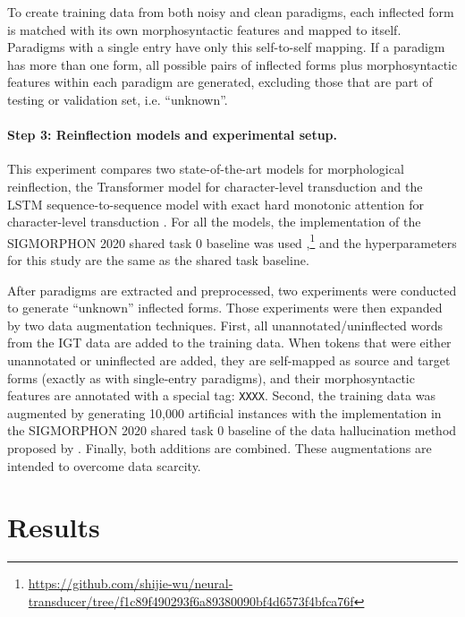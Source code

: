 To create training data from both noisy and clean paradigms, each inflected form is matched with its own morphosyntactic features and mapped to itself. Paradigms with a single entry have only this self-to-self mapping. If a paradigm has more than one form, all possible pairs of inflected forms plus morphosyntactic features within each paradigm are generated, excluding those that are part of testing or validation set, i.e. ``unknown''.
 

\paragraph{Step 3: Reinflection models and experimental setup.}
This experiment compares two state-of-the-art models for morphological reinflection, the Transformer model for character-level transduction \citep{wu2020applying} and the LSTM sequence-to-sequence model with exact hard monotonic attention for character-level transduction \citep{wu-cotterell-2019-exact}. For all the models, the implementation of the SIGMORPHON 2020 shared task 0 baseline was used \citep{vylomova2020sigmorphon},\footnote{\url{https://github.com/shijie-wu/neural-transducer/tree/f1c89f490293f6a89380090bf4d6573f4bfca76f}} and the hyperparameters for this study are the same as the shared task baseline.

After paradigms are extracted and preprocessed, two experiments were conducted to generate ``unknown'' inflected forms. Those experiments were then expanded by two data augmentation techniques. First, all unannotated/uninflected words from the IGT data are added to the training data. When tokens that were either unannotated or uninflected are added, they are self-mapped as source and target forms (exactly as with single-entry paradigms), and their morphosyntactic features are annotated with a special tag: \texttt{XXXX}.  Second, the training data was augmented by generating 10,000 artificial instances with the implementation in the SIGMORPHON 2020 shared task 0 baseline of the data hallucination method proposed by \citet{anastasopoulos-neubig-2019-pushing}. Finally, both additions are combined. These augmentations are intended to overcome data scarcity. 


\section{Results}
\label{sec:IGT2Presults}

